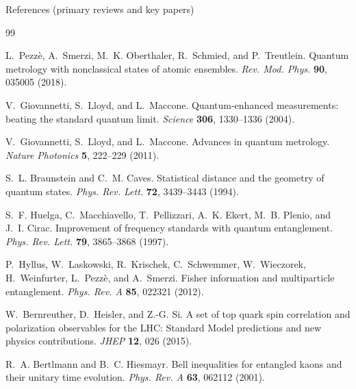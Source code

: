 \documentclass[aspectratio=169]{beamer}
\begin{document}
\begin{frame}{References (primary reviews and key papers)}
\footnotesize
\begin{thebibliography}{99}\setlength{\itemsep}{0.35em}

L.~Pezz\`e, A.~Smerzi, M.~K. Oberthaler, R.~Schmied, and P.~Treutlein.
\newblock Quantum metrology with nonclassical states of atomic ensembles.
\newblock \emph{Rev. Mod. Phys.} \textbf{90}, 035005 (2018).

V.~Giovannetti, S.~Lloyd, and L.~Maccone.
\newblock Quantum-enhanced measurements: beating the standard quantum limit.
\newblock \emph{Science} \textbf{306}, 1330--1336 (2004).

V.~Giovannetti, S.~Lloyd, and L.~Maccone.
\newblock Advances in quantum metrology.
\newblock \emph{Nature Photonics} \textbf{5}, 222--229 (2011).

S.~L. Braunstein and C.~M. Caves.
\newblock Statistical distance and the geometry of quantum states.
\newblock \emph{Phys. Rev. Lett.} \textbf{72}, 3439--3443 (1994).

S.~F. Huelga, C.~Macchiavello, T.~Pellizzari, A.~K. Ekert, M.~B. Plenio, and J.~I. Cirac.
\newblock Improvement of frequency standards with quantum entanglement.
\newblock \emph{Phys. Rev. Lett.} \textbf{79}, 3865--3868 (1997).

P.~Hyllus, W.~Laskowski, R.~Krischek, C.~Schwemmer, W.~Wieczorek, H.~Weinfurter, L.~Pezz\`e, and A.~Smerzi.
\newblock Fisher information and multiparticle entanglement.
\newblock \emph{Phys. Rev. A} \textbf{85}, 022321 (2012).

W.~Bernreuther, D.~Heisler, and Z.-G. Si.
\newblock A set of top quark spin correlation and polarization observables for the LHC:
Standard Model predictions and new physics contributions.
\newblock \emph{JHEP} \textbf{12}, 026 (2015).

R.~A. Bertlmann and B.~C. Hiesmayr.
\newblock Bell inequalities for entangled kaons and their unitary time evolution.
\newblock \emph{Phys. Rev. A} \textbf{63}, 062112 (2001).


\end{thebibliography}
\end{frame}
\end{document}
